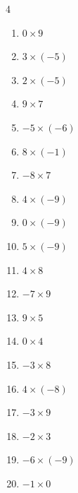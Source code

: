 \begin{multicols}{4}
\begin{enumerate}
  \item $0\times 9$
        \phantom{$=0$}

  \item $3\times (-5)$
        \phantom{$=-15$}

  \item $2\times (-5)$
        \phantom{$=-10$}

\columnbreak %

\resetques

  \item $9\times 7$
        \phantom{$=63$}

  \item $-5\times (-6)$
        \phantom{$=30$}

  \item $8\times (-1)$
        \phantom{$=-8$}

  \item $-8\times 7$
        \phantom{$=-56$}

  \item $4\times (-9)$
        \phantom{$=-36$}

  \item $0\times (-9)$
        \phantom{$=0$}

  \item $5\times (-9)$
        \phantom{$=-45$}

  \item $4\times 8$
        \phantom{$=32$}

  \item $-7\times 9$
        \phantom{$=-63$}

  \item $9\times 5$
        \phantom{$=45$}

  \item $0\times 4$
        \phantom{$=0$}

  \item $-3\times 8$
        \phantom{$=-24$}

  \item $4\times (-8)$
        \phantom{$=-32$}

  \item $-3\times 9$
        \phantom{$=-27$}

  \item $-2\times 3$
        \phantom{$=-6$}

  \item $-6\times (-9)$
        \phantom{$=54$}

  \item $-1\times 0$
        \phantom{$=0$}


\end{enumerate}
\end{multicols}
